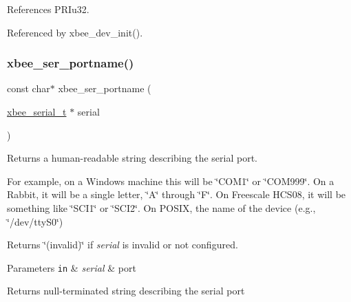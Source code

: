 References P\+R\+Iu32.



Referenced by xbee\+\_\+dev\+\_\+init().

\mbox{\label{group__xbee__serial_ga898057d1b7645785e7f3d6256828d039}} 
\subsubsection{\texorpdfstring{xbee\+\_\+ser\+\_\+portname()}{xbee\_ser\_portname()}}
{\footnotesize\ttfamily const char$\ast$ xbee\+\_\+ser\+\_\+portname (\begin{DoxyParamCaption}\item[{\hyperlink{structxbee__serial__t}{xbee\+\_\+serial\+\_\+t} $\ast$}]{serial }\end{DoxyParamCaption})}



Returns a human-\/readable string describing the serial port. 

For example, on a Windows machine this will be \char`\"{}\+C\+O\+M1\char`\"{} or \char`\"{}\+C\+O\+M999\char`\"{}. On a Rabbit, it will be a single letter, \char`\"{}\+A\char`\"{} through \char`\"{}\+F\char`\"{}. On Freescale H\+C\+S08, it will be something like \char`\"{}\+S\+C\+I1\char`\"{} or \char`\"{}\+S\+C\+I2\char`\"{}. On P\+O\+S\+IX, the name of the device (e.\+g., \char`\"{}/dev/tty\+S0\char`\"{})

Returns \char`\"{}(invalid)\char`\"{} if {\itshape serial} is invalid or not configured.


\begin{DoxyParams}[1]{Parameters}
\mbox{\tt in}  & {\em serial} & port\\
\hline
\end{DoxyParams}
\begin{DoxyReturn}{Returns}
null-\/terminated string describing the serial port 
\end{DoxyReturn}
\mbox{\label{group__xbee__serial_ga86fea2345efb8bf9424228f0979b1849}} 

